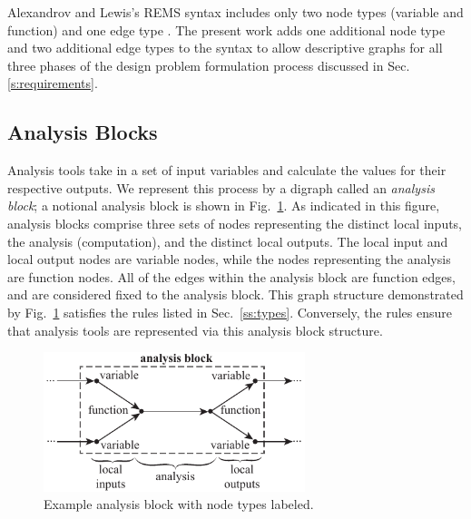  Alexandrov and Lewis's REMS syntax includes only two node types (variable and function) 
  and one edge type   \cite{alexandrov2004}. The present work adds one additional 
  node type and two additional edge types to the syntax to allow descriptive
  graphs for all three phases of the design problem formulation process discussed 
  in Sec. \ref{s:requirements}.

\subsection{Analysis Blocks}
\label{ss:analysis blocks}
  Analysis tools take in a set of input variables and calculate 
  the values for their respective outputs. We represent this process
  by a digraph called an \emph{analysis block}; a notional analysis block is shown 
  in Fig.~\ref{f:analysis block}. 
  As indicated in this figure, analysis blocks comprise three sets of nodes 
  representing the distinct local inputs, the analysis (computation), and the 
  distinct local outputs. The local input and local output nodes are variable 
  nodes, while the nodes representing the analysis are function nodes. All of 
  the edges within the analysis block are function edges, and are considered 
  fixed to the analysis block. This graph structure demonstrated by 
  Fig.~\ref{f:analysis block} satisfies the rules listed in Sec.~\ref{ss:types}. 
  Conversely, the rules ensure that analysis tools are represented via this analysis 
  block structure.

  \begin{figure}[htb]
      \begin{center}
      \includegraphics[width=3.0in]{images/analysis_block}
      \end{center}
      \vspace{-10pt}
  \caption{Example analysis block with node types labeled.}
  \label{f:analysis block}
  \end{figure}

